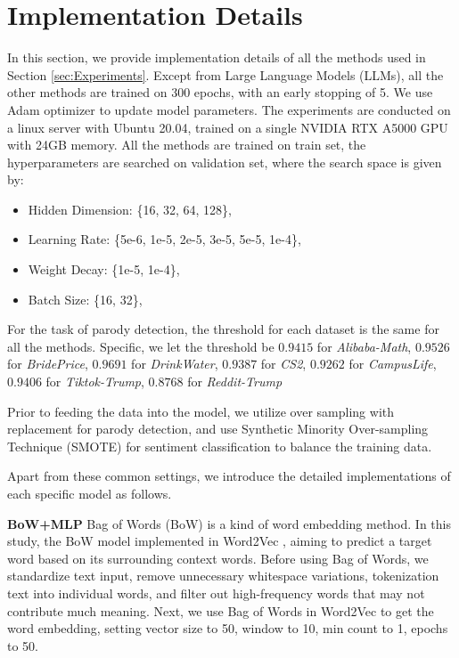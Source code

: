 \section{Implementation Details}


In this section, we provide implementation details of all the methods used in Section \ref{sec:Experiments}. Except from Large Language Models (LLMs), all the other methods are trained on 300 epochs, with an early stopping of 5. We use Adam optimizer to update model parameters. The experiments are conducted on a linux server with Ubuntu 20.04, trained on a single NVIDIA RTX A5000 GPU with 24GB memory. All the methods are trained on train set, the hyperparameters are searched on validation set, where the search space is given by:

\begin{itemize}
    \item Hidden Dimension: \{16, 32, 64, 128\},
    \item Learning Rate: \{5e-6, 1e-5, 2e-5, 3e-5, 5e-5, 1e-4\},
    \item Weight Decay: \{1e-5, 1e-4\},
    \item Batch Size: \{16, 32\},
\end{itemize}

For the task of parody detection, the threshold for each dataset is the same for all the methods. Specific, we let the threshold be $0.9415$ for \textit{Alibaba-Math}, $0.9526$ for \textit{BridePrice}, $0.9691$ for \textit{DrinkWater}, $0.9387$ for \textit{CS2}, $0.9262$ for \textit{CampusLife}, $0.9406$ for \textit{Tiktok-Trump}, $0.8768$ for \textit{Reddit-Trump}

Prior to feeding the data into the model, we utilize over sampling with replacement for parody detection, and use Synthetic Minority Over-sampling Technique (SMOTE) \citep{chawla2002smote} for sentiment classification to balance the training data.

Apart from these common settings, we introduce the detailed implementations of each specific model as follows.

\textbf{BoW+MLP} \citep{BoW}
Bag of Words (BoW) is a kind of word embedding method. In this study, the BoW model implemented in Word2Vec \citep{BoW}, aiming to predict a target word based on its surrounding context words. Before using Bag of Words, we standardize text input, remove unnecessary whitespace variations, tokenization text into individual words, and filter out high-frequency words that may not contribute much meaning. Next, we use Bag of Words in Word2Vec to get the word embedding, setting vector size to 50, window to 10, min count to 1, epochs to 50.

